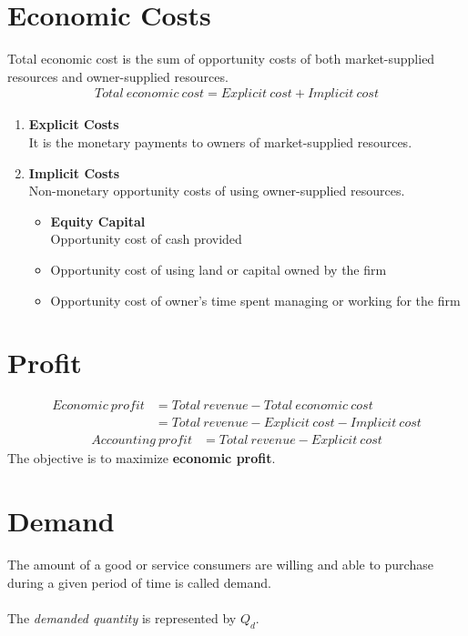 \documentclass[oneside]{book}
\begin{document}
\section{Economic Costs}
Total economic cost is the sum of opportunity costs of both market-supplied resources and owner-supplied resources.
\begin{align*}
	Total\ economic\ cost = Explicit\ cost + Implicit\ cost
\end{align*}
\begin{enumerate}
	\item \textbf{Explicit Costs}\\
	      It is the monetary payments to owners of market-supplied resources.
	\item \textbf{Implicit Costs}\\
	      Non-monetary opportunity costs of using owner-supplied resources.
	      \begin{itemize}
		      \item \textbf{Equity Capital}\\Opportunity cost of cash provided
		      \item Opportunity cost of using land or capital owned by the firm
		      \item Opportunity cost of owner's time spent managing or working for the firm
	      \end{itemize}
\end{enumerate}

\section{Profit}
\begin{align*}
	Economic\ profit & = Total\ revenue - Total\ economic\ cost           \\
	                 & = Total\ revenue - Explicit\ cost - Implicit\ cost
\end{align*}
\begin{align*}
	Accounting\ profit & = Total\ revenue - Explicit\ cost
\end{align*}
The objective is to maximize \textbf{economic profit}.

\section{Demand}
The amount of a good or service consumers are willing and able to purchase during a given period of time is called demand.
\\\\
The \textit{demanded quantity} is represented by \(Q_d\).
\end{document}
